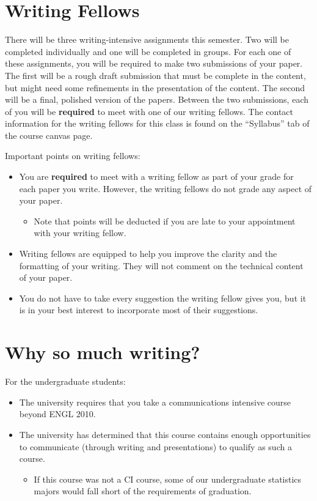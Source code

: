 \documentclass[12pt]{notes}
\begin{document}

\section{Writing Fellows}
There will be three writing-intensive assignments this semester. Two will be completed individually and one will be completed in groups. For each one of these assignments, you will be required to make two submissions of your paper. The first will be a rough draft submission that must be complete in the content, but might need some refinements in the presentation of the content. The second will be a final, polished version of the papers. Between the two submissions, each of you will be \textbf{required} to meet with one of our writing fellows. The contact information for the writing fellows for this class is found on the ``Syllabus'' tab of the course canvas page. 

\nspace
Important points on writing fellows:
\begin{itemize}
\item You are \textbf{required} to meet with a writing fellow as part of your grade for each paper you write. However, the writing fellows do not grade any aspect of your paper. 
\begin{itemize}
\item Note that points will be deducted if you are late to your appointment with your writing fellow. 
\end{itemize}
\item Writing fellows are equipped to help you improve the clarity and the formatting of your writing. They will not comment on the technical content of your paper. 
\item You do not have to take every suggestion the writing fellow gives you, but it is in your best interest to incorporate most of their suggestions. 
\end{itemize}

\section{Why so much writing?}
For the undergraduate students:
\begin{itemize}
\item The university requires that you take a communications intensive course beyond ENGL 2010.
\item The university has determined that this course contains enough opportunities to communicate (through writing and presentations) to qualify as such a course. 
\begin{itemize}
\item If this course was not a CI course, some of our undergraduate statistics majors would fall short of the requirements of graduation. 
\end{itemize}
\end{itemize}
\end{document}
